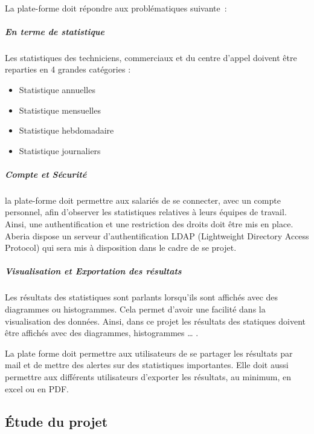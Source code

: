 \documentclass[a4paper,12pt]{report}
\begin{document}
\paragraph*{}
La plate-forme doit répondre aux problématiques suivante : 

\subparagraph{ En terme de statistique\newline}

Les statistiques des techniciens, commerciaux et du centre d’appel doivent être reparties en 4 grandes catégories :\newline

\begin{itemize}
 \item Statistique annuelles
 \item Statistique mensuelles
 \item Statistique hebdomadaire
 \item Statistique journaliers 
\end{itemize}


\subparagraph{Compte et Sécurité\newline\newline}
la plate-forme doit permettre aux salariés de se connecter, avec un compte personnel, afin d'observer les statistiques relatives à leurs équipes de travail. Ainsi, une authentification et une restriction des droits doit être mis en place. Aberia dispose un serveur d’authentification LDAP (Lightweight Directory Access Protocol) qui sera mis à disposition dans le cadre de se projet.

\subparagraph{Visualisation et Exportation des résultats\newline\newline}

                      Les résultats des statistiques sont parlants lorsqu’ils sont affichés avec des diagrammes ou histogrammes. Cela permet d’avoir une facilité dans la visualisation des données. Ainsi, dans ce projet les résultats des statiques doivent être affichés avec des diagrammes, histogrammes … . \newline
           
           La plate forme doit permettre aux utilisateurs  de se partager les résultats par mail  et de mettre des alertes sur des statistiques importantes. Elle doit aussi permettre aux différents utilisateurs d’exporter les résultats, au minimum, en excel ou en PDF. 
             
\subsection{Étude du projet}
\end{document}
